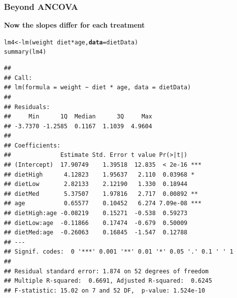 \documentclass[color=usenames,dvipsnames]{beamer}\usepackage[]{graphicx}\usepackage[]{color}
\makeatletter
\newcommand{\hlopt}[1]{\textcolor[rgb]{0,0,0}{#1}}%
\newcommand{\hlstd}[1]{\textcolor[rgb]{0,0,0}{#1}}%
\newcommand{\hlkwb}[1]{\textcolor[rgb]{0,0.341,0.682}{#1}}%
\newcommand{\hlkwc}[1]{\textcolor[rgb]{0,0,0}{\textbf{#1}}}%
\newcommand{\hlkwd}[1]{\textcolor[rgb]{0.004,0.004,0.506}{#1}}%
\newenvironment{kframe}{%
 \def\at@end@of@kframe{}%
 \ifinner\ifhmode%
  \def\at@end@of@kframe{\end{minipage}}%
  \begin{minipage}{\columnwidth}%
 \fi\fi%
 \def\FrameCommand##1{\hskip\@totalleftmargin \hskip-\fboxsep
 \colorbox{shadecolor}{##1}\hskip-\fboxsep
     \hskip-\linewidth \hskip-\@totalleftmargin \hskip\columnwidth}%
 \MakeFramed {\advance\hsize-\width
   \@totalleftmargin\z@ \linewidth\hsize
   \@setminipage}}%
 {\par\unskip\endMakeFramed%
 \at@end@of@kframe}
\newenvironment{knitrout}{}{} %
\makeatother
\begin{document}
\begin{frame}[fragile]
  \frametitle{Beyond ANCOVA}
  {\bf Now the slopes differ for each treatment}
  \tiny
\begin{knitrout}\tiny
{}\color{fgcolor}\begin{kframe}
\begin{alltt}
\hlstd{lm4} \hlkwb{<-} \hlkwd{lm}\hlstd{(weight} \hlopt{~} \hlstd{diet} \hlopt{*} \hlstd{age,} \hlkwc{data}\hlstd{=dietData)}
\hlkwd{summary}\hlstd{(lm4)}
\end{alltt}
\begin{verbatim}
## 
## Call:
## lm(formula = weight ~ diet * age, data = dietData)
## 
## Residuals:
##     Min      1Q  Median      3Q     Max 
## -3.7370 -1.2585  0.1167  1.1039  4.9604 
## 
## Coefficients:
##              Estimate Std. Error t value Pr(>|t|)    
## (Intercept)  17.90749    1.39518  12.835  < 2e-16 ***
## dietHigh      4.12823    1.95637   2.110  0.03968 *  
## dietLow       2.82133    2.12190   1.330  0.18944    
## dietMed       5.37507    1.97816   2.717  0.00892 ** 
## age           0.65577    0.10452   6.274 7.09e-08 ***
## dietHigh:age -0.08219    0.15271  -0.538  0.59273    
## dietLow:age  -0.11866    0.17474  -0.679  0.50009    
## dietMed:age  -0.26063    0.16845  -1.547  0.12788    
## ---
## Signif. codes:  0 '***' 0.001 '**' 0.01 '*' 0.05 '.' 0.1 ' ' 1
## 
## Residual standard error: 1.874 on 52 degrees of freedom
## Multiple R-squared:  0.6691,	Adjusted R-squared:  0.6245 
## F-statistic: 15.02 on 7 and 52 DF,  p-value: 1.524e-10
\end{verbatim}
\end{kframe}
\end{knitrout}
\end{frame}
\end{document}
